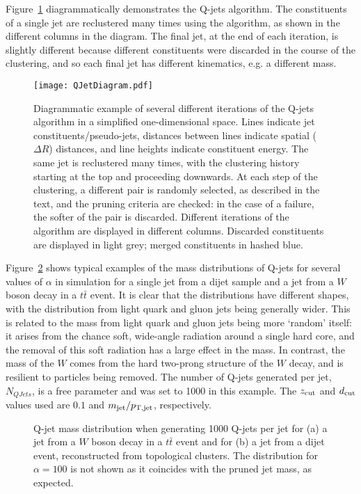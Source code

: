 Figure~\ref{fig:Qjet_diagram} diagrammatically demonstrates the Q-jets algorithm. The constituents of a single jet are reclustered many times using the algorithm, as shown in the different columns in the diagram. The final jet, at the end of each iteration, is slightly different because different constituents were discarded in the course of the clustering, and so each final jet has different kinematics, e.g. a different mass.

\begin{figure}[htbp]
\centering
\texttt{[image: QJetDiagram.pdf]}
\caption{Diagrammatic example of several different iterations of the Q-jets algorithm in a simplified one-dimensional space. Lines indicate jet constituents/pseudo-jets, distances between lines indicate spatial ($\Delta R$) distances, and line heights indicate constituent energy. The same jet is reclustered many times, with the clustering history starting at the top and proceeding downwards. At each step of the clustering, a different pair is randomly selected, as described in the text, and the pruning criteria are checked: in the case of a failure, the softer of the pair is discarded. Different iterations of the algorithm are displayed in different columns. Discarded constituents are displayed in light grey; merged constituents in hashed blue.} 
\label{fig:Qjet_diagram}
\end{figure}

Figure~\ref{fig:Qjet_distrib} shows typical examples of the mass distributions of Q-jets for several values of $\alpha$ in simulation for a single jet from a dijet sample and a jet from a $W$ boson decay in a $t\bar{t}$ event. It is clear that the distributions have different shapes, with the distribution from light quark and gluon jets being generally wider. This is related to the mass from light quark and gluon jets being more `random' itself: it arises from the chance soft, wide-angle radiation around a single hard core, and the removal of this soft radiation has a large effect in the mass. In contrast, the mass of the $W$ comes from the hard two-prong structure of the $W$ decay, and is resilient to particles being removed. The number of Q-jets generated per jet, $N_{QJets}$, is a free parameter and was set to 1000 in this example. The $z_{\rm cut}$ and $d_{\rm cut}$ values used are $0.1$ and $m_{\rm jet}/p_{\rm T, jet}$, respectively.

\begin{figure}[htbp]
\centering
{}
\caption{Q-jet mass distribution when generating 1000 Q-jets per jet for (a) a jet from a $W$ boson decay in a $t\bar{t}$ event and for (b) a jet from a dijet event, reconstructed from topological clusters. The distribution for $\alpha=100$ is not shown as it coincides with the pruned jet mass, as expected.} %
\label{fig:Qjet_distrib}
\end{figure}

